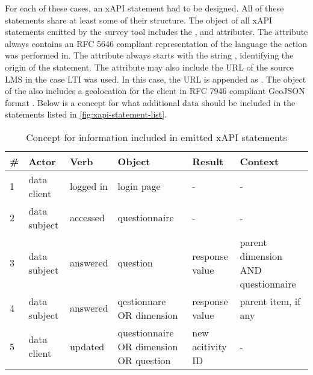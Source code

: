     For each of these cases, an xAPI statement had to be designed.
    All of these statements share at least some of their structure.
    The  object of all xAPI statements emitted by the survey
    tool includes the ,  and 
     attributes. The  attribute always
    contains an RFC 5646 \cite{rfc-5646}
    compliant representation of the language the action was performed
    in. The  attribute always starts with the
    string , identifying the origin of the statement.
    The  attribute may also include the URL
    of the source LMS in the case LTI was used. In this case,
    the URL is appended as .
    The  object of the  also
    includes a geolocation for the client in RFC 7946 compliant GeoJSON
    format \cite{rfc-7946}.
    Below is a concept for what additional data should be included in 
    the statements listed in \ref{fig:xapi-statement-list}.

    \begin{table}[h]
        \begin{tabularx}{\textwidth}{|l|l|l|X|X|X|}
            \hline
            \# & Actor & Verb & Object & Result & Context \\ 
            \hline \hline
            1 & data client & logged in & login page & - & - \\ 
            2 & data subject & accessed & questionnaire & - & - \\ 
            3 & data subject & answered & question & response value & parent dimension AND questionnaire  \\ 
            4 & data subject & answered & qestionnare OR dimension & response value & parent item, if any \\ 
            5 & data client & updated & questionnaire OR dimension OR question & new acitivity ID & - \\ 
            \hline
        \end{tabularx}
        \caption{Concept for information included in emitted xAPI statements}
        \label{table:xapi-data-concept}
    \end{table}

